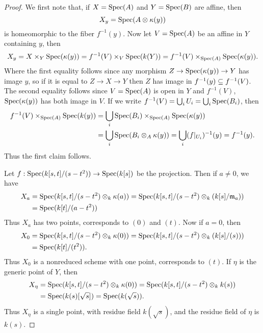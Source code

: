 \documentclass[11pt]{book}
\theoremstyle{definition}
\begin{document}
\begin{proof}
We first note that, if $X=\mathrm{Spec}(A)$ and $Y=\mathrm{Spec}(B)$ are affine, then
\[X_y=\mathrm{Spec}(A\otimes\kappa(y))\]
is homeomorphic to the fiber $f^{-1}(y)$. Now let $V=\mathrm{Spec}(A)$ be an affine in $Y$ containing $y$, then
\[X_y=X\times_Y\mathrm{Spec}(\kappa(y))=f^{-1}(V)\times_{V}\mathrm{Spec}(k(Y))=f^{-1}(V)\times_{\mathrm{Spec}(A)}\mathrm{Spec}(\kappa(y)).\]
Where the first equality follows since any morphism $Z\to\mathrm{Spec}(\kappa(y))\to Y$ has image $y$, so if it is equal to $Z\to X\to Y$ then $Z$ has image in $f^{-1}(y)\subseteq f^{-1}(V)$. The second equality follows since $V=\mathrm{Spec}(A)$ is open in $Y$ and $f^{-1}(V)$, $\mathrm{Spec}(\kappa(y))$ has both image in $V$. If we write $f^{-1}(V)=\bigcup_iU_i=\bigcup_i\mathrm{Spec}(B_i)$, then
\begin{align*}
f^{-1}(V)\times_{\mathrm{Spec}(A)}\mathrm{Spec}(k(y))&=\bigcup_i\mathrm{Spec}(B_i)\times_{\mathrm{Spec}(A)}\mathrm{Spec}(\kappa(y))\\
&=\bigcup_i\mathrm{Spec}(B_i\otimes_{A}\kappa(y))=\bigcup_i(f|_{U_i})^{-1}(y)=f^{-1}(y).
\end{align*}
Thus the first claim follows.\par
Let $f:\mathrm{Spec}(k[s,t]/(s-t^2))\to\mathrm{Spec}(k[s])$ be the projection. Then if $a\neq 0$, we have
\begin{align*}
X_a&=\mathrm{Spec}(k[s,t]/(s-t^2)\otimes_k\kappa(a))=\mathrm{Spec}(k[s,t]/(s-t^2)\otimes_k(k[s]/\mathfrak{m}_a))\\
&=\mathrm{Spec}(k[t]/(a-t^2))
\end{align*}
Thus $X_a$ has two points, corresponds to $(0)$ and $(t)$. Now if $a=0$, then
\begin{align*}
X_0&=\mathrm{Spec}(k[s,t]/(s-t^2)\otimes_k\kappa(0))=\mathrm{Spec}(k[s,t]/(s-t^2)\otimes_k(k[s]/(s)))\\
&=\mathrm{Spec}(k[t]/(t^2)).
\end{align*}
Thus $X_0$ is a nonreduced scheme with one point, corresponds to $(t)$. If $\eta$ is the generic point of $Y$, then
\begin{align*}
X_\eta&=\mathrm{Spec}(k[s,t]/(s-t^2)\otimes_k\kappa(0))=\mathrm{Spec}(k[s,t]/(s-t^2)\otimes_kk(s))\\
&=\mathrm{Spec}(k(s)[\sqrt{s}])=\mathrm{Spec}(k(\sqrt{s})).
\end{align*}
Thus $X_\eta$ is a single point, with residue field $k(\sqrt{s})$, and the residue field of $\eta$ is $k(s)$.
\end{proof}
\end{document}
